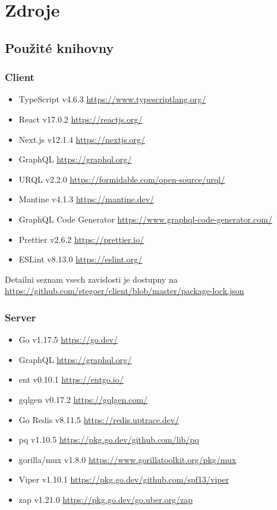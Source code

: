 
\section{Zdroje}\label{sec:zdroje}

\subsection{Použité knihovny}\label{subsec:pouzite-knihovny}

\subsubsection{Client}\label{subsubsec:client}
\begin{itemize}
    \item TypeScript v4.6.3 \url{https://www.typescriptlang.org/}
    \item React v17.0.2 \url{https://reactjs.org/}
    \item Next.js v12.1.4 \url{https://nextjs.org/}
    \item GraphQL \url{https://graphql.org/}
    \item URQL v2.2.0 \url{https://formidable.com/open-source/urql/}
    \item Mantine v4.1.3 \url{https://mantine.dev/}
    \item GraphQL Code Generator \url{https://www.graphql-code-generator.com/}
    \item Prettier v2.6.2 \url{https://prettier.io/}
    \item ESLint v8.13.0 \url{https://eslint.org/}
\end{itemize}

Detailni seznam vsech zavislosti je dostupny na
\url{https://github.com/stegoer/client/blob/master/package-lock.json}

\subsubsection{Server}\label{subsubsec:server}
\begin{itemize}
    \item Go v1.17.5 \url{https://go.dev/}
    \item GraphQL \url{https://graphql.org/}
    \item ent v0.10.1 \url{https://entgo.io/}
    \item gqlgen v0.17.2 \url{https://gqlgen.com/}
    \item Go Redis v8.11.5 \url{https://redis.uptrace.dev/}
    \item pq v1.10.5 \url{https://pkg.go.dev/github.com/lib/pq}
    \item gorilla/mux v1.8.0 \url{https://www.gorillatoolkit.org/pkg/mux}
    \item Viper v1.10.1 \url{https://pkg.go.dev/github.com/spf13/viper}
    \item zap v1.21.0 \url{https://pkg.go.dev/go.uber.org/zap}
\end{itemize}


